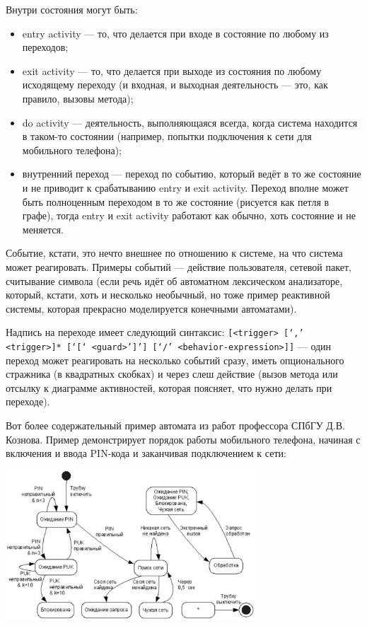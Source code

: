 \documentclass{../mcstext}
\begin{document}
Внутри состояния могут быть:

\begin{itemize}
    \item entry activity --- то, что делается при входе в состояние по любому из переходов;
    \item exit activity --- то, что делается при выходе из состояния по любому исходящему переходу (и входная, и выходная деятельность --- это, как правило, вызовы метода);
    \item do activity --- деятельность, выполняющаяся всегда, когда система находится в таком-то состоянии (например, попытки подключения к сети для мобильного телефона);
    \item внутренний переход --- переход по событию, который ведёт в то же состояние и не приводит к срабатыванию entry и exit activity. Переход вполне может быть полноценным переходом в то же состояние (рисуется как петля в графе), тогда entry и exit activity работают как обычно, хоть состояние и не меняется.
\end{itemize}

Событие, кстати, это нечто внешнее по отношению к системе, на что система может реагировать. Примеры событий --- действие пользователя, сетевой пакет, считывание символа (если речь идёт об автоматном лексическом анализаторе, который, кстати, хоть и несколько необычный, но тоже пример реактивной системы, которая прекрасно моделируется конечными автоматами).

Надпись на переходе имеет следующий синтаксис: \verb|[<trigger> [‘,’ <trigger>]* [‘[‘ <guard>’]’] [‘/’ <behavior-expression>]]| --- один переход может реагировать на несколько событий сразу, иметь опционального стражника (в квадратных скобках) и через слеш действие (вызов метода или отсылку к диаграмме активностей, которая поясняет, что нужно делать при переходе).

Вот более содержательный пример автомата из работ профессора СПбГУ Д.В. Кознова. Пример демонстрирует порядок работы мобильного телефона, начиная с включения и ввода PIN-кода и заканчивая подключением к сети:

\begin{center}
    \includegraphics[width=0.7\textwidth]{stateTransitionExample2.png}
\end{center}
\end{document}
